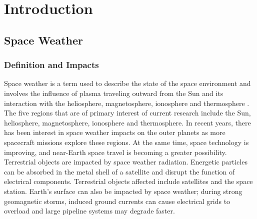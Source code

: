 \chapter[Introduction]{Introduction}

\section{Space Weather}
\subsection{Definition and Impacts}
Space weather is a term used to describe the state of the space environment and
involves the influence of plasma traveling outward from the Sun and its
interaction with the heliosphere, magnetosphere, ionosphere and thermosphere
\citep{Thomson2000}. The five regions that are of primary interest of current
research include the Sun, heliosphere, magnetosphere, ionosphere and
thermosphere. In recent years, there has been interest in space weather impacts
on the outer planets as more spacecraft missions explore these regions.
At the same time, space technology is improving, and near-Earth space travel is
becoming a greater possibility. Terrestrial objects are impacted by space
weather radiation. Energetic particles can be absorbed in the metal shell of a
satellite and disrupt the function of electrical components.
Terrestrial objects affected include satellites and the space station.
Earth's surface can also be impacted by space weather; during strong
geomagnetic storms, induced ground currents can cause electrical grids to
overload and large pipeline systems may degrade faster.
